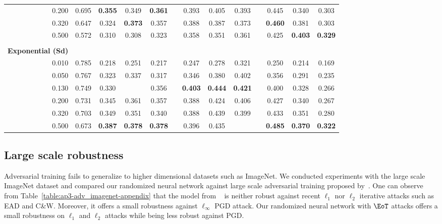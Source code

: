 \begin{table}[htbp]
\begin{tabular}{rcccccccccccc}
    0.200 & 0.695 & \textbf{0.355} & 0.349 & \textbf{0.361} &       & 0.393 & 0.405 & 0.393 &       & 0.445 & 0.340 & 0.303 \\
    0.320 & 0.647 & 0.324 & \textbf{0.373} & 0.357 &       & 0.388 & 0.387 & 0.373 &       & \textbf{0.460} & 0.381 & 0.303 \\
    0.500 & 0.572 & 0.310 & 0.308 & 0.323 &       & 0.358 & 0.351 & 0.361 &       & 0.425 & \textbf{0.403} & \textbf{0.329} \\
          &       &       &       &       &       &       &       &       &       &       &       &  \\
    \textbf{Exponential (Sd)} &       &       &       &       &       &       &       &       &       &       &       &  \\
    \midrule
    0.010 & 0.785 & 0.218 & 0.251 & 0.217 &       & 0.247 & 0.278 & 0.321 &       & 0.250 & 0.214 & 0.169 \\
    0.050 & 0.767 & 0.323 & 0.337 & 0.317 &       & 0.346 & 0.380 & 0.402 &       & 0.356 & 0.291 & 0.235 \\
    0.130 & 0.749 & 0.330 &       & 0.356 &       & \textbf{0.403} & \textbf{0.444} & \textbf{0.421} &       & 0.400 & 0.328 & 0.266 \\
    0.200 & 0.731 & 0.345 & 0.361 & 0.357 &       & 0.388 & 0.424 & 0.406 &       & 0.427 & 0.340 & 0.267 \\
    0.320 & 0.703 & 0.349 & 0.351 & 0.340 &       & 0.388 & 0.439 & 0.399 &       & 0.433 & 0.351 & 0.280 \\
    0.500 & 0.673 & \textbf{0.387} & \textbf{0.378} & \textbf{0.378} &       & 0.396 & 0.435 &       &       & \textbf{0.485} & \textbf{0.370} & \textbf{0.322} \\
    \bottomrule
    \end{tabular}%
\end{table}%

\subsection{Large scale robustness}

Adversarial training fails to generalize to higher dimensional datasets such as ImageNet.
We conducted experiments with the large scale ImageNet dataset and compared our randomized neural network against large scale adversarial training proposed by~\citet{kurakin2016adversarial}.
One can observe from Table~\ref{table:ap3-adv_imagenet-appendix} that the model from ~\citet{kurakin2016adversarial} is neither robust against recent $\ell_1$ nor $\ell_2$ iterative attacks such as EAD and C\&W.
Moreover, it offers a small robustness against $\ell_\infty$ PGD attack.
Our randomized neural network with $\EoT$ attacks offers a small robustness on $\ell_1$ and $\ell_2$ attacks while being less robust against PGD. 

